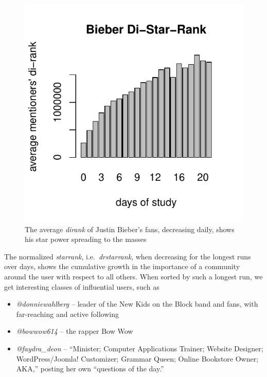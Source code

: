 \documentclass[10pt,oneside]{memoir}
\begin{document}
\begin{Spacing}{2}
\begin{figure}
\begin{center}
    \includegraphics{figures/bieber-distarrank}
    \caption{The average \emph{dirank} of Justin Bieber's fans, decreasing daily, shows his star power spreading to the masses}
    \label{figure:bieber-distarrank}
\end{center}
\end{figure}
The normalized {\itshape starrank}, i.e.\ {\itshape drstarrank}, when decreasing for the longest runs over days, shows the cumulative growth in the importance of a community around the user with respect to all others.  When sorted by such a longest run, we get interesting classes of influential users, such as


\begin{itemize}


\item {\itshape @donniewahlberg} -- leader of the New Kids on the Block band and fans, with far-reaching and active following

\item {\itshape @bowwow614} -- the rapper Bow Wow

\item \emph{@faydra\_deon} -- ``Minister; Computer Applications Trainer; Website Designer; WordPress/Joomla! Customizer; Grammar Queen; Online Bookstore Owner; AKA,'' posting her own ``questions of the day.''
\end{itemize}


\end{Spacing}
\end{document}
